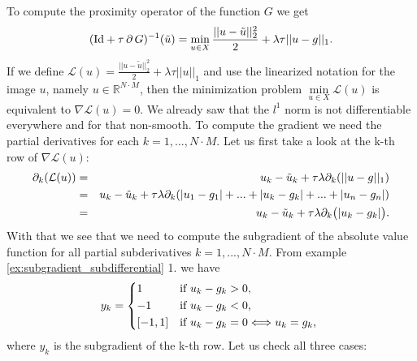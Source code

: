        To compute the proximity operator of the function $G$ we get
            $$
                (\textnormal{Id} + \tau\,\partial\,G)^{-1}(\tilde{u}) = \min_{u \in X} \frac{||u - \tilde{u}||_{2}^{2}}{2} + \lambda\tau||u - g||_{1}.
            $$
        If we define $\mathcal{L}(u) = \frac{||u - \tilde{u}||_{2}^{2}}{2} + \lambda\tau||u||_{1}$ and use the linearized notation for the image $u$, namely $u \in \mathbb{R}^{N \cdot M}$, then the minimization problem $\min\limits_{u \in X} \mathcal{L}(u)$ is equivalent to $\nabla\mathcal{L}(u) = 0$. We already saw that the $l^{1}$ norm is not differentiable everywhere and for that non-smooth. To compute the gradient we need the partial derivatives for each $k = 1, ..., N \cdot M$. Let us first take a look at the k-th row of $\nabla\mathcal{L}(u)$:
            \begin{eqnarray}
                \partial_{k}(\mathcal{L}(u)) &=& u_{k} - \tilde{u}_{k} + \tau\lambda \partial_{k}(||u-g||_{1}) \notag \\
                &=& u_{k} - \tilde{u}_{k} + \tau\lambda \partial_{k}(|u_{1}-g_{1}| + ... + |u_{k}-g_{k}| + ... + |u_{n}-g_{n}|) \notag \\
                &=& u_{k} - \tilde{u}_{k} + \tau \lambda \partial_{k}\big(|u_{k} - g_{k}|\big).
            \end{eqnarray}
        With that we see that we need to compute the subgradient of the absolute value function for all partial subderivatives $k = 1, ..., N \cdot M$. From example \ref{ex:subgradient_subdifferential} 1. we have
            $$
                y_{k} =
                    \begin{dcases*}
                        1 & \textnormal{if $u_{k} - g_{k} > 0$,} \\
                        -1 & \textnormal{if $u_{k} - g_{k} < 0$,} \\
                        [-1, 1] & \textnormal{if $u_{k} - g_{k} = 0 \Longleftrightarrow u_{k} = g_{k}$,}
                    \end{dcases*}
            $$
        where $y_{k}$ is the subgradient of the k-th row. Let us check all three cases:
